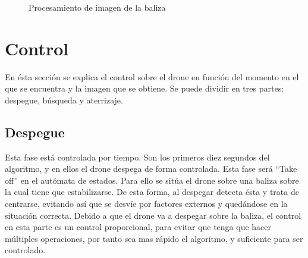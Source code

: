 \begin{figure}[H]
 \centering
 \caption{Procesamiento de imagen de la baliza}
 \label{f:ColorFilterTotal}
\end{figure} 



\section{Control}
\label{sec.control}

\hspace{1 cm} En \'esta secci\'on se explica el control sobre el drone en funci\'on del momento en el que se encuentra y la imagen que se obtiene. Se puede dividir en tres partes:
despegue, b\'usqueda y aterrizaje.


\subsection{Despegue}

\hspace{1 cm} Esta fase est\'a controlada por tiempo. Son los primeros diez segundos del algoritmo, y en ellos el drone despega de forma controlada. Esta fase ser\'a "`Take off"' en el aut\'omata de estados. Para ello se sit\'ua el drone sobre una baliza sobre la cual tiene que estabilizarse. De esta forma, al despegar detecta \'esta y trata de centrarse, evitando as\'i que se desv\'ie por factores externos y qued\'andose en la situaci\'on correcta. Debido a que el drone va a despegar sobre la baliza, el control en esta parte es un control proporcional, para evitar que tenga que hacer m\'ultiples operaciones, por tanto sea mas r\'apido el algoritmo, y suficiente para ser controlado.



